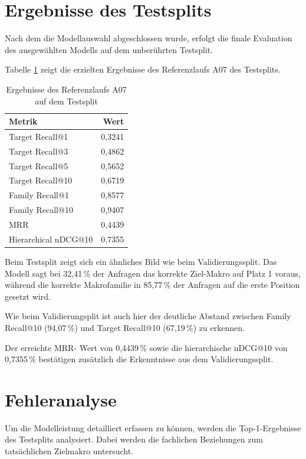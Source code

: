 \section{Ergebnisse des Testsplits}

Nach dem die Modellauswahl abgeschlossen wurde, erfolgt die finale Evaluation des ausgewählten Modells auf dem unberührten Testsplit.

Tabelle \ref{tab:test_ergebnisse} zeigt die erzielten Ergebnisse des Referenzlaufs A07 des Testsplits. 

\begin{table}[tbp] 
  \centering 
  \caption{Ergebnisse des Referenzlaufs A07 auf dem Testsplit} 
  \label{tab:test_ergebnisse} 
  \begin{tabular}{lr} \toprule \textbf{Metrik} & \textbf{Wert} \\ \midrule 
    Target Recall@1 & 0,3241 \\ 
    Target Recall@3 & 0,4862 \\ 
    Target Recall@5 & 0,5652 \\ 
    Target Recall@10 & 0,6719 \\ 
    Family Recall@1 & 0,8577 \\ 
    Family Recall@10 & 0,9407 \\ 
    MRR & 0,4439 \\ 
    Hierarchical nDCG@10 & 0,7355 \\ 
    \bottomrule 
  \end{tabular} 
\end{table}

Beim Testsplit zeigt sich ein ähnliches Bild wie beim Validierungssplit. Das Modell sagt bei 32,41\,\% der Anfragen das korrekte Ziel-Makro \parencite{EPLAN-Makros} auf Platz 1 voraus, während die korrekte Makrofamilie in 85,77\,\% der Anfragen auf die erste Position gesetzt wird.

Wie beim Validierungsplit ist auch hier der deutliche Abstand zwischen Family Recall@10 (94,07\,\%) und Target Recall@10 (67,19\,\%) zu erkennen. 

Der erreichte MRR- Wert von 0,4439\,\% sowie die hierarchische nDCG@10 von 0,7355\,\% bestätigen zusätzlich die Erkenntnisse aus dem Validierungssplit.

\section{Fehleranalyse}

Um die Modelleistung detailliert erfassen zu können, werden die Top-1-Ergebnisse des Testsplits analysiert. Dabei werden die fachlichen Beziehungen zum tatsächlichen Zielmakro untersucht.

